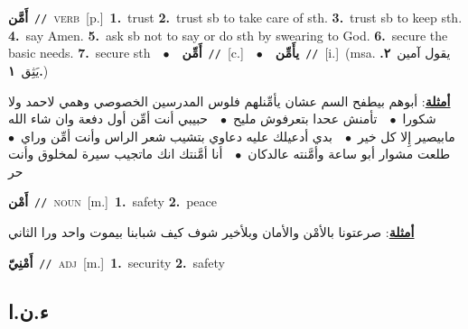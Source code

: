 \documentclass[10pt,a4paper,twoside]{article} %
\begin{document}
\begin{multicols}{2}
{\setlength\topsep{0pt}\textbf{\foreignlanguage{arabic}{أَمَّن}}\ {\color{gray}\texttt{//}\color{black}}\ \textsc{verb}\ [p.]\ \textbf{1.}~trust  \textbf{2.}~trust sb to take care of sth.  \textbf{3.}~trust sb to keep sth.  \textbf{4.}~say Amen.  \textbf{5.}~ask sb not to say or do sth by swearing to God.  \textbf{6.}~secure the basic needs.  \textbf{7.}~secure sth\ \ $\bullet$\ \ \setlength\topsep{0pt}\textbf{\foreignlanguage{arabic}{أَمِّن}}\ {\color{gray}\texttt{//}\color{black}}\ [c.]\ \ $\bullet$\ \ \setlength\topsep{0pt}\textbf{\foreignlanguage{arabic}{يأَمِّن}}\ {\color{gray}\texttt{//}\color{black}}\ [i.]\ \color{gray}(msa. \foreignlanguage{arabic}{يقول آمين}~\foreignlanguage{arabic}{\textbf{٢.}}  \foreignlanguage{arabic}{يَثِق}~\foreignlanguage{arabic}{\textbf{١.}})\color{black}\  \begin{flushright}\color{gray}\foreignlanguage{arabic}{\textbf{\underline{\foreignlanguage{arabic}{أمثلة}}}: أبوهم بيطفح السم عشان يأمِّنلهم فلوس المدرسين الخصوصي وهمي لاحمد ولا شكورا\ $\bullet$\ \  تأمنش عحدا بتعرفوش مليح\ $\bullet$\ \  حبيبي أنت أمِّن أول دفعة وان شاء الله مابيصير إِلا كل خير\ $\bullet$\ \  بدي أدعيلك عليه دعاوي بتشيب شعر الراس وأنت أمِّن وراي\ $\bullet$\ \  طلعت مشوار أبو ساعة وأمَّنته عالدكان\ $\bullet$\ \  أنا أمَّنتك انك ماتجيب سيرة لمخلوق وأنت حر}\end{flushright}\color{black}} \vspace{2mm}

{\setlength\topsep{0pt}\textbf{\foreignlanguage{arabic}{أَمْن}}\ {\color{gray}\texttt{//}\color{black}}\ \textsc{noun}\ [m.]\ \textbf{1.}~safety  \textbf{2.}~peace\  \begin{flushright}\color{gray}\foreignlanguage{arabic}{\textbf{\underline{\foreignlanguage{arabic}{أمثلة}}}: صرعتونا بالأمْن والأمان وبلأخير شوف كيف شبابنا بيموت واحد ورا الثاني}\end{flushright}\color{black}} \vspace{2mm}

{\setlength\topsep{0pt}\textbf{\foreignlanguage{arabic}{أَمْنِيّ}}\ {\color{gray}\texttt{//}\color{black}}\ \textsc{adj}\ [m.]\ \textbf{1.}~security  \textbf{2.}~safety\ } \vspace{2mm}

\vspace{-3mm}
\subsection*{\color{blue}\foreignlanguage{arabic}{ء.ن.ا}\color{blue}{ (ntws)}} 


\end{multicols}
\end{document}
